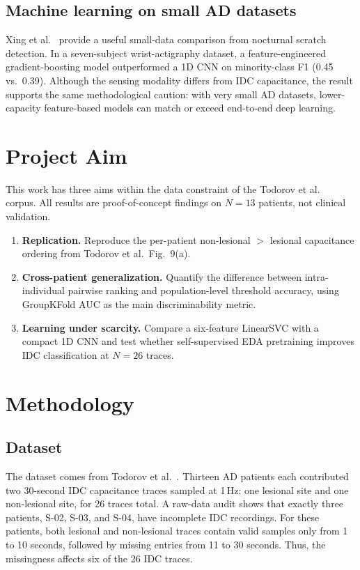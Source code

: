 \documentclass[acmtog]{acmart}
\begin{document}
\subsection*{Machine learning on small AD datasets}
Xing et al.\ \cite{xing2024nocturnal} provide a useful small-data comparison
from nocturnal scratch detection. In a seven-subject wrist-actigraphy dataset,
a feature-engineered gradient-boosting model outperformed a 1D CNN on
minority-class F1 (0.45 vs.\ 0.39). Although the sensing modality differs from
IDC capacitance, the result supports the same methodological caution: with very
small AD datasets, lower-capacity feature-based models can match or exceed
end-to-end deep learning.

\section{Project Aim}\label{sec:aim}
This work has three aims within the data constraint of the Todorov et al.\
\cite{todorov2025wearable} corpus. All results are proof-of-concept findings on
$N{=}13$ patients, not clinical validation.

\begin{enumerate}
  \item \textbf{Replication.} Reproduce the per-patient non-lesional $>$ lesional
        capacitance ordering from Todorov et al.\ Fig.\ 9(a).
  \item \textbf{Cross-patient generalization.} Quantify the difference between
        intra-individual pairwise ranking and population-level threshold accuracy,
        using GroupKFold AUC as the main discriminability metric.
  \item \textbf{Learning under scarcity.} Compare a six-feature LinearSVC with a
        compact 1D CNN and test whether self-supervised EDA pretraining improves
        IDC classification at $N{=}26$ traces.
\end{enumerate}

\section{Methodology}\label{sec:methodology}


\subsection{Dataset}
The dataset comes from Todorov et al.\ \cite{todorov2025wearable}. Thirteen AD
patients each contributed two 30-second IDC capacitance traces sampled at 1\,Hz:
one lesional site and one non-lesional site, for 26 traces total. A raw-data audit
shows that exactly three patients, S-02, S-03, and S-04, have incomplete IDC
recordings. For these patients, both lesional and non-lesional traces contain
valid samples only from 1 to 10 seconds, followed by missing entries from 11 to
30 seconds. Thus, the missingness affects six of the 26 IDC traces.
\end{document}

